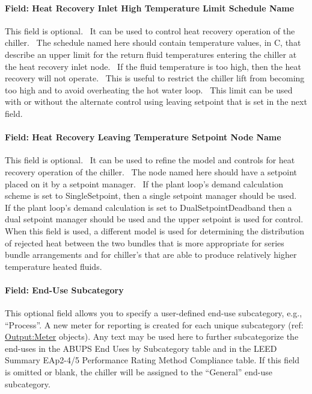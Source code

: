 \paragraph{Field: Heat Recovery Inlet High Temperature Limit Schedule Name}\label{field-heat-recovery-inlet-high-temperature-limit-schedule-name-2}

This field is optional.~ It can be used to control heat recovery operation of the chiller.~ The schedule named here should contain temperature values, in C, that describe an upper limit for the return fluid temperatures entering the chiller at the heat recovery inlet node.~ If the fluid temperature is too high, then the heat recovery will not operate.~ This is useful to restrict the chiller lift from becoming too high and to avoid overheating the hot water loop.~ This limit can be used with or without the alternate control using leaving setpoint that is set in the next field.

\paragraph{Field: Heat Recovery Leaving Temperature Setpoint Node Name}\label{field-heat-recovery-leaving-temperature-setpoint-node-name-2}

This field is optional.~ It can be used to refine the model and controls for heat recovery operation of the chiller.~ The node named here should have a setpoint placed on it by a setpoint manager.~ If the plant loop's demand calculation scheme is set to SingleSetpoint, then a single setpoint manager should be used.~ If the plant loop's demand calculation is set to DualSetpointDeadband then a dual setpoint manager should be used and the upper setpoint is used for control.~ When this field is used, a different model is used for determining the distribution of rejected heat between the two bundles that is more appropriate for series bundle arrangements and for chiller's that are able to produce relatively higher temperature heated fluids.

\paragraph{Field: End-Use Subcategory}\label{end-use-subcategory-12}

This optional field allows you to specify a user-defined end-use subcategory, e.g., ``Process''. A new meter for reporting is created for each unique subcategory (ref: \hyperref[outputmeter-and-outputmetermeterfileonly]{Output:Meter} objects). Any text may be used here to further subcategorize the end-uses in the ABUPS End Uses by Subcategory table and in the LEED Summary EAp2-4/5 Performance Rating Method Compliance table. If this field is omitted or blank, the chiller will be assigned to the ``General'' end-use subcategory.


